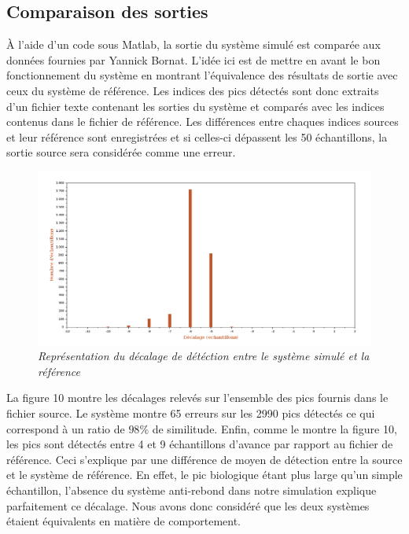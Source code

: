 \documentclass[a4paper,12pt]{article}
\begin{document}
\subsection{Comparaison des sorties}
À l'aide d'un code sous Matlab, la sortie du système simulé est comparée aux données fournies par Yannick Bornat. L'idée ici est de mettre en avant le bon fonctionnement du système en montrant l'équivalence des résultats de sortie avec ceux du système de référence. Les indices des pics détectés sont donc extraits d'un fichier texte contenant les sorties du système et comparés avec les indices contenus dans le fichier de référence. Les différences entre chaques indices sources et leur référence sont enregistrées et si celles-ci dépassent les 50 échantillons, la sortie source sera considérée comme une erreur. 
\begin{figure}[H]
	\centering
	\includegraphics[scale = 0.4, keepaspectratio]{ResultatSim.png}
	\caption{\textit{Représentation du décalage de détéction entre le système simulé et la référence}}
\end{figure}
La figure 10 montre les décalages relevés sur l'ensemble des pics fournis dans le fichier source. Le système montre 65 erreurs sur les 2990 pics détectés ce qui correspond à un ratio de $98\%$ de similitude. Enfin, comme le montre la figure 10, les pics sont détectés entre 4 et 9 échantillons d'avance par rapport au fichier de référence. Ceci s'explique par une différence de moyen de détection entre la source et le système de référence. En effet, le pic biologique étant plus large qu'un simple échantillon, l'absence du système anti-rebond dans notre simulation explique parfaitement ce décalage. Nous avons donc considéré que les deux systèmes étaient équivalents en matière de comportement.
\newpage
\end{document}
